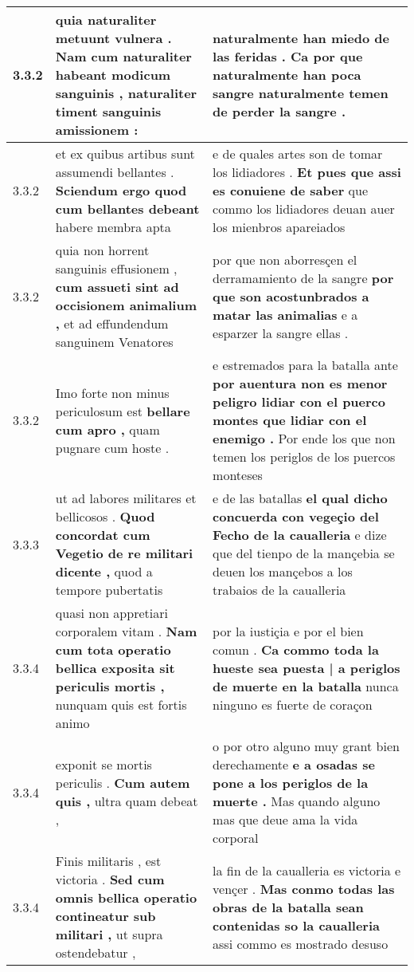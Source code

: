 \begin{tabular}{|p{1cm}|p{6.5cm}|p{6.5cm}|}
3.3.2 & quia naturaliter metuunt vulnera . \textbf{ Nam cum naturaliter habeant modicum sanguinis , } naturaliter timent sanguinis amissionem : & naturalmente han miedo de las feridas . \textbf{ Ca por que naturalmente han poca sangre } naturalmente temen de perder la sangre . \\\hline
3.3.2 & et ex quibus artibus sunt assumendi bellantes . \textbf{ Sciendum ergo quod cum bellantes debeant } habere membra apta & e de quales artes son de tomar los lidiadores . \textbf{ Et pues que assi es conuiene de saber } que commo los lidiadores deuan auer los mienbros apareiados \\\hline
3.3.2 & quia non horrent sanguinis effusionem , \textbf{ cum assueti sint ad occisionem animalium , } et ad effundendum sanguinem Venatores & por que non aborresçen el derramamiento de la sangre \textbf{ por que son acostunbrados a matar las animalias } e a esparzer la sangre ellas . \\\hline
3.3.2 & Imo forte non minus periculosum est \textbf{ bellare cum apro , } quam pugnare cum hoste . & e estremados para la batalla ante \textbf{ por auentura non es menor peligro lidiar con el puerco montes que lidiar con el enemigo . } Por ende los que non temen los periglos de los puercos monteses \\\hline
3.3.3 & ut ad labores militares et bellicosos . \textbf{ Quod concordat cum Vegetio de re militari dicente , } quod a tempore pubertatis & e de las batallas \textbf{ el qual dicho concuerda con vegeçio del Fecho de la caualleria } e dize que del tienpo de la mançebia se deuen los mançebos a los trabaios de la caualleria \\\hline
3.3.4 & quasi non appretiari corporalem vitam . \textbf{ Nam cum tota operatio bellica exposita sit periculis mortis , } nunquam quis est fortis animo & por la iustiçia e por el bien comun . \textbf{ Ca commo toda la hueste sea puesta | a periglos de muerte en la batalla } nunca ninguno es fuerte de coraçon \\\hline
3.3.4 & exponit se mortis periculis . \textbf{ Cum autem quis , } ultra quam debeat , & o por otro alguno muy grant bien derechamente \textbf{ e a osadas se pone a los periglos de la muerte . } Mas quando alguno mas que deue ama la vida corporal \\\hline
3.3.4 & Finis militaris , est victoria . \textbf{ Sed cum omnis bellica operatio contineatur sub militari , } ut supra ostendebatur , & la fin de la caualleria es victoria e vençer . \textbf{ Mas conmo todas las obras de la batalla sean contenidas so la caualleria } assi commo es mostrado desuso \\\hline

\end{tabular}
